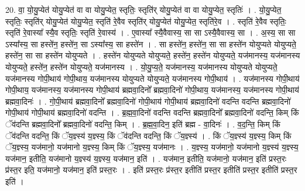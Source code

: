 \documentclass[17pt]{extarticle}
\begin{document}
20. वा॒ यो॒यु॒प्येत॑ योयु॒प्येत॑ वा वा योयु॒प्येत॒ स्तृतिः॒ स्तृति॑र् योयु॒प्येत॑ वा वा योयु॒प्येत॒ स्तृतिः॑ । . यो॒यु॒प्येत॒ स्तृतिः॒ स्तृति॑र् योयु॒प्येत॑ योयु॒प्येत॒ स्तृति॑ रे॒वैव स्तृति॑र् योयु॒प्येत॑ योयु॒प्येत॒ स्तृति॑रे॒व । . स्तृति॑ रे॒वैव स्तृतिः॒ स्तृति॑ रे॒वास्या᳚ स्यै॒व स्तृतिः॒ स्तृति॑ रे॒वास्य॑ । . ए॒वास्या᳚ स्यै॒वैवास्य॒ सा सा ऽस्यै॒वैवास्य॒ सा । . अ॒स्य॒ सा सा ऽस्या᳚स्य॒ सा हस्ते॑न॒ हस्ते॑न॒ सा ऽस्या᳚स्य॒ सा हस्ते॑न । . सा हस्ते॑न॒ हस्ते॑न॒ सा सा हस्ते॑न योयुप्यते योयुप्यते॒ हस्ते॑न॒ सा सा हस्ते॑न योयुप्यते । . हस्ते॑न योयुप्यते योयुप्यते॒ हस्ते॑न॒ हस्ते॑न योयुप्यते॒ यज॑मानस्य॒ यज॑मानस्य योयुप्यते॒ हस्ते॑न॒ हस्ते॑न योयुप्यते॒ यज॑मानस्य । . यो॒यु॒प्य॒ते॒ यज॑मानस्य॒ यज॑मानस्य योयुप्यते योयुप्यते॒ यज॑मानस्य गोपी॒थाय॑ गोपी॒थाय॒ यज॑मानस्य योयुप्यते योयुप्यते॒ यज॑मानस्य गोपी॒थाय॑ । . यज॑मानस्य गोपी॒थाय॑ गोपी॒थाय॒ यज॑मानस्य॒ यज॑मानस्य गोपी॒थाय॑ ब्रह्मवा॒दिनो᳚ ब्रह्मवा॒दिनो॑ गोपी॒थाय॒ यज॑मानस्य॒ यज॑मानस्य गोपी॒थाय॑ ब्रह्मवा॒दिनः॑ । . गो॒पी॒थाय॑ ब्रह्मवा॒दिनो᳚ ब्रह्मवा॒दिनो॑ गोपी॒थाय॑ गोपी॒थाय॑ ब्रह्मवा॒दिनो॑ वदन्ति वदन्ति ब्रह्मवा॒दिनो॑ गोपी॒थाय॑ गोपी॒थाय॑ ब्रह्मवा॒दिनो॑ वदन्ति । . ब्र॒ह्म॒वा॒दिनो॑ वदन्ति वदन्ति ब्रह्मवा॒दिनो᳚ ब्रह्मवा॒दिनो॑ वदन्ति॒ किम् किं ॅव॑दन्ति ब्रह्मवा॒दिनो᳚ ब्रह्मवा॒दिनो॑ वदन्ति॒ किम् । . ब्र॒ह्म॒वा॒दिन॒ इति॑ ब्रह्म - वा॒दिनः॑ । . व॒द॒न्ति॒ किम् किं ॅव॑दन्ति वदन्ति॒ किं ॅय॒ज्ञ्स्य॑ य॒ज्ञ्स्य॒ किं ॅव॑दन्ति वदन्ति॒ किं ॅय॒ज्ञ्स्य॑ । . किं ॅय॒ज्ञ्स्य॑ य॒ज्ञ्स्य॒ किम् किं ॅय॒ज्ञ्स्य॒ यज॑मानो॒ यज॑मानो य॒ज्ञ्स्य॒ किम् किं ॅय॒ज्ञ्स्य॒ यज॑मानः । . य॒ज्ञ्स्य॒ यज॑मानो॒ यज॑मानो य॒ज्ञ्स्य॑ य॒ज्ञ्स्य॒ यज॑मान॒ इतीति॒ यज॑मानो य॒ज्ञ्स्य॑ य॒ज्ञ्स्य॒ यज॑मान॒ इति॑ । . यज॑मान॒ इतीति॒ यज॑मानो॒ यज॑मान॒ इति॑ प्रस्त॒रः प्र॑स्त॒र इति॒ यज॑मानो॒ यज॑मान॒ इति॑ प्रस्त॒रः । . इति॑ प्रस्त॒रः प्र॑स्त॒र इतीति॑ प्रस्त॒र इतीति॑ प्रस्त॒र इतीति॑ प्रस्त॒र इति॑ । \newline
\end{document}
